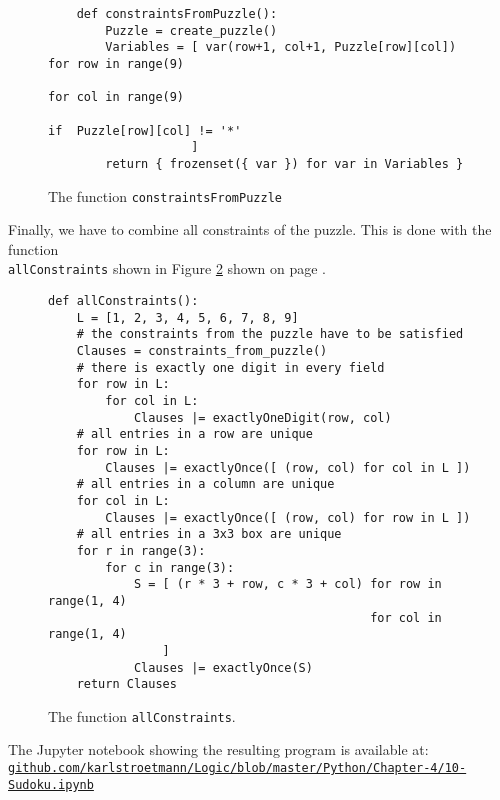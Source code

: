 \begin{figure}[!ht]
\centering
\begin{verbatim}
    def constraintsFromPuzzle():
        Puzzle = create_puzzle()
        Variables = [ var(row+1, col+1, Puzzle[row][col]) for row in range(9)
                                                          for col in range(9)
                                                          if  Puzzle[row][col] != '*'
                    ]
        return { frozenset({ var }) for var in Variables }                 
\end{verbatim}
\vspace*{-0.3cm}
\caption{The function \texttt{constraintsFromPuzzle}}
\label{fig:sudoku-constraintsFromPuzzle}
\end{figure}

Finally, we have to combine all constraints of the puzzle.  This is done with the function \\
\texttt{allConstraints} shown in Figure \ref{fig:sudoku-allConstraints} shown on page \pageref{fig:sudoku-allConstraints}.

\begin{figure}[!ht]
\centering
\begin{verbatim}
def allConstraints(): 
    L = [1, 2, 3, 4, 5, 6, 7, 8, 9]
    # the constraints from the puzzle have to be satisfied
    Clauses = constraints_from_puzzle()
    # there is exactly one digit in every field
    for row in L:
        for col in L:
            Clauses |= exactlyOneDigit(row, col) 
    # all entries in a row are unique
    for row in L:
        Clauses |= exactlyOnce([ (row, col) for col in L ]) 
    # all entries in a column are unique
    for col in L:
        Clauses |= exactlyOnce([ (row, col) for row in L ])
    # all entries in a 3x3 box are unique    
    for r in range(3):
        for c in range(3):
            S = [ (r * 3 + row, c * 3 + col) for row in range(1, 4)
                                             for col in range(1, 4) 
                ]
            Clauses |= exactlyOnce(S)
    return Clauses
 \end{verbatim}
\vspace*{-0.3cm}
\caption{The function \texttt{allConstraints}.}
\label{fig:sudoku-allConstraints}
\end{figure}
The Jupyter notebook showing the resulting program is available at:
\\[0.2cm]
\hspace*{1.3cm}
\href{https://github.com/karlstroetmann/Logic/blob/master/Python/Chapter-4/10-Sudoku.ipynb}{\texttt{github.com/karlstroetmann/Logic/blob/master/Python/Chapter-4/10-Sudoku.ipynb}}


